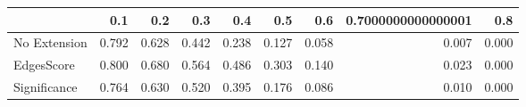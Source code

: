 \begin{tabular}{lrrrrrrrr}
\toprule
{} &   0.1 &   0.2 &   0.3 &   0.4 &   0.5 &   0.6 & 0.7000000000000001 &   0.8 \\
\midrule
No Extension & 0.792 & 0.628 & 0.442 & 0.238 & 0.127 & 0.058 &              0.007 & 0.000 \\
EdgesScore   & 0.800 & 0.680 & 0.564 & 0.486 & 0.303 & 0.140 &              0.023 & 0.000 \\
Significance & 0.764 & 0.630 & 0.520 & 0.395 & 0.176 & 0.086 &              0.010 & 0.000 \\
\bottomrule
\end{tabular}
